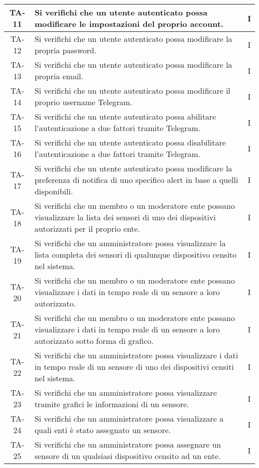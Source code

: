 \begin{center}
\begin{longtable}{|c|p{10cm}|c|}
			 \hline
			 TA-11 & Si verifichi che un utente autenticato possa modificare le impostazioni del proprio account. & I \\
			 \hline
			 TA-12 & Si verifichi che un utente autenticato possa modificare la propria password. & I \\
			 \hline
			 TA-13 & Si verifichi che un utente autenticato possa modificare la propria email. & I \\
			 \hline
			 TA-14 & Si verifichi che un utente autenticato possa modificare il proprio username Telegram. & I \\
			 \hline
			 TA-15 & Si verifichi che un utente autenticato possa abilitare l'autenticazione a due fattori tramite Telegram. & I \\
			 \hline
			 TA-16 & Si verifichi che un utente autenticato possa disabilitare l'autenticazione a due fattori tramite Telegram. & I \\
			 \hline
			 TA-17 & Si verifichi che un utente autenticato possa modificare la preferenza di notifica di uno specifico alert in base a quelli disponibili. & I \\
			 \hline
			 TA-18 & Si verifichi che un membro o un moderatore ente possano visualizzare la lista dei sensori di uno dei dispositivi autorizzati per il proprio ente. & I \\
			 \hline
			 TA-19 & Si verifichi che un amministratore possa visualizzare la lista completa dei sensori di qualunque dispositivo censito nel sistema. & I \\
			 \hline
			 TA-20 & Si verifichi che un membro o un moderatore ente possano visualizzare i dati in tempo reale di un sensore a loro autorizzato. & I \\
			 \hline
			 TA-21 & Si verifichi che un membro o un moderatore ente possano visualizzare i dati in tempo reale di un sensore a loro autorizzato sotto forma di grafico. & I \\
			 \hline
			 TA-22 & Si verifichi che un amministratore possa visualizzare i dati in tempo reale di un sensore di uno dei dispositivi censiti nel sistema. & I \\
			 \hline
			 TA-23 & Si verifichi che un amministratore possa visualizzare tramite grafici le informazioni di un sensore. & I \\
			 \hline
			 TA-24 & Si verifichi che un amministratore possa visualizzare a quali enti è stato assegnato un sensore. & I \\
			 \hline
			 TA-25 & Si verifichi che un amministratore possa assegnare un sensore di un qualsiasi dispositivo censito ad un ente. & I \\

\end{longtable}
\end{center}
